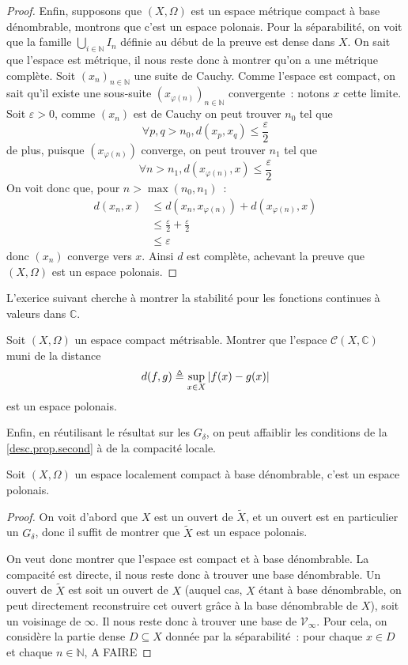 \begin{proof}
  Enfin, supposons que $(X,\Omega)$ est un espace métrique compact à base
  dénombrable, montrons que c'est un espace polonais. Pour la séparabilité,
  on voit que la famille $\bigcup_{i \in \mathbb N} I_n$ définie au début de la
  preuve est dense dans $X$. On sait que l'espace est métrique, il nous reste
  donc à montrer qu'on a une métrique complète. Soit $(x_n)_{n\in\mathbb N}$
  une suite de Cauchy. Comme l'espace est compact, on sait qu'il existe une
  sous-suite $(x_{\varphi(n)})_{n\in\mathbb N}$ convergente~: notons $x$ cette
  limite. Soit $\varepsilon > 0$, comme $(x_n)$ est de Cauchy on peut trouver
  $n_0$ tel que
  \[\forall p,q > n_0, d(x_p,x_q) \leq \frac{\varepsilon}{2}\]
  de plus, puisque $(x_{\varphi(n)})$ converge, on peut trouver $n_1$ tel que
  \[\forall n > n_1, d(x_{\varphi(n)},x) \leq \frac{\varepsilon}{2}\]
  On voit donc que, pour $n > \max(n_0,n_1)$~:
  \begin{align*}
    d(x_n,x) &\leq d(x_n,x_{\varphi(n)}) + d(x_{\varphi(n)},x)\\
    &\leq \frac{\varepsilon}{2} + \frac{\varepsilon}{2}\\
    &\leq\varepsilon
  \end{align*}
  donc $(x_n)$ converge vers $x$. Ainsi $d$ est complète, achevant la preuve
  que $(X,\Omega)$ est un espace polonais.
\end{proof}

L'exerice suivant cherche à montrer la stabilité pour les fonctions continues à
valeurs dans $\mathbb C$.

\begin{exercise}
  Soit $(X,\Omega)$ un espace compact métrisable. Montrer que l'espace
  $\mathcal C(X,\mathbb C)$ muni de la distance
  \[d(f,g) \triangleq \sup_{x \in X}|f(x) - g(x)|\]
  est un espace polonais.
\end{exercise}

Enfin, en réutilisant le résultat sur les $G_\delta$, on peut affaiblir les
conditions de la \cref{desc.prop.second} à de la compacité locale.

\begin{proposition}
  Soit $(X,\Omega)$ un espace localement compact à base dénombrable, c'est un
  espace polonais.
\end{proposition}

\begin{proof}
  On voit d'abord que $X$ est un ouvert de $\tilde X$, et un ouvert est en
  particulier un $G_\delta$, donc il suffit de montrer que $\tilde X$ est un
  espace polonais.

  On veut donc montrer que l'espace est compact et à base dénombrable. La
  compacité est directe, il nous reste donc à trouver une base dénombrable. Un
  ouvert de $\tilde X$ est soit un ouvert de $X$ (auquel cas, $X$ étant à base
  dénombrable, on peut directement reconstruire cet ouvert grâce à la base
  dénombrable de $X$), soit un voisinage de $\infty$. Il nous reste donc à
  trouver une base de $\mathcal V_\infty$. Pour cela, on considère la partie
  dense $D\subseteq X$ donnée par la séparabilité~: pour chaque $x\in D$ et
  chaque $n \in \mathbb N$, A FAIRE
\end{proof}


